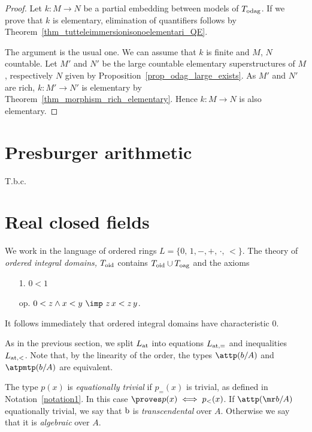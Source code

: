 \begin{proof}
  Let $k:M\to N$ be a partial embedding between models of $T_{\rm odag}$.
  If we prove that $k$ is elementary, elimination of quantifiers follows by Theorem~\ref{thm_tutteleimmersionisonoelementari_QE}.
  
  The argument is the usual one.
  We can assume that $k$ is finite and $M$, $N$ countable.
  Let $M'$ and $N'$ be the large countable elementary superstructures of $M$, respectively $N$ given by Proposition~\ref{prop_odag_large_exists}.
  As $M'$ and $N'$ are rich, $k:M'\to N'$ is elementary by Theorem~\ref{thm_morphism_rich_elementary}.
  Hence $k:M\to N$ is also elementary.
\end{proof}

\section{Presburger arithmetic}

T.b.c.

\section{Real closed fields}

We work in the language of ordered rings $L=\{0,\,1,-,+,\,\cdot,\,<\}$.
%
The theory of \emph{ordered integral domains,} $T_{\rm oid}$ contains $T_{\rm oid}\cup T_{\rm oag}$ and the axioms

\begin{itemize}
  \item[1.]  $0<1$
  \item[op.] $0<z\wedge x<y\ \imp\ z\,x<z\,y$.
\end{itemize}

It follows immediately that ordered integral domains have characteristic $0$.

As in the previous section, we split $L_{\rm at}$ into equations $L_{\rm at,=}$ and inequalities $L_{\rm at,<}$.
Note that, by the linearity of the order, the types $\attp(b/A)$ and $\atpmtp(b/A)$ are equivalent.

The type $p(x)$ is \emph{equationally trivial\/} if $p_{=}(x)$ is trivial, as defined in Notation~\ref{notation1}. 
In this case $\proves p(x)\iff p_<(x)$.
If $\attp({\mr b}/A)$ equationally trivial, we say that ${\rm b}$ is \emph{transcendental\/} over $A$.
%
Otherwise we say that it is \emph{algebraic\/} over $A$.

